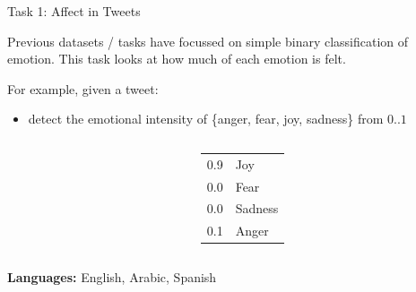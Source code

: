 \documentclass[10pt, compress]{beamer}
\begin{document}
\begin{frame}{Task 1: Affect in Tweets}

Previous datasets / tasks have focussed on simple binary classification of emotion.
This task looks at how much of each emotion is felt.

For example, given a tweet:
\begin{itemize}
  \item detect the emotional intensity of \{anger, fear, joy, sadness\} from $0..1$
\end{itemize}

\begin{columns}
    \begin{column}{0.75\textwidth}
    \end{column}
    \begin{column}{0.2\textwidth}
        \begin{tabular}{rl}
          0.9 & Joy \\
          0.0 & Fear \\ 
          0.0 & Sadness \\ 
          0.1 & Anger \\
        \end{tabular}
    \end{column}
\end{columns}
%
\textbf{Languages:} English, Arabic, Spanish

\end{frame}
\end{document}
